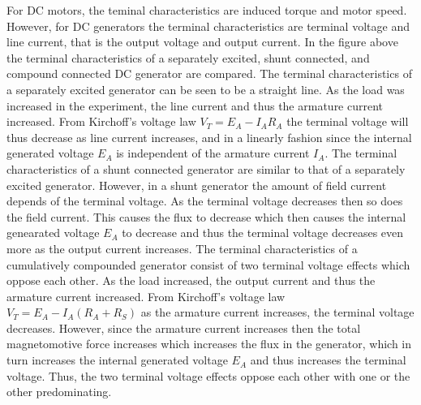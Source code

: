 \documentclass{article}
\begin{document}
For DC motors, the teminal characteristics are induced torque and motor speed. However, for DC generators the 
terminal characteristics are terminal voltage and line current, that is the output voltage and output current. 
In the figure above the terminal characteristics of a separately excited, shunt connected, and compound connected
DC generator are compared. The terminal characteristics of a separately excited generator can be seen to be a straight 
line. As the load was increased in the experiment, the line current and thus the armature current increased. From 
Kirchoff's voltage law $V_T = E_A - I_AR_A$ the terminal voltage will thus decrease as line current increases, and 
in a linearly fashion since the internal generated voltage $E_A$ is independent of the armature current $I_A$. The 
terminal characteristics of a shunt connected generator are similar to that of a separately excited generator. However,
in a shunt generator the amount of field current depends of the terminal voltage. As the terminal voltage decreases then 
so does the field current. This causes the flux to decrease which then causes the internal genearated voltage $E_A$ to 
decrease and thus the terminal voltage decreases even more as the output current increases. The terminal characteristics 
of a cumulatively compounded generator consist of two terminal voltage effects which oppose each other. As the load 
increased, the output current and thus the armature current increased. From Kirchoff's voltage law 
$V_T = E_A - I_A(R_A + R_S)$ as the armature current increases, the terminal voltage decreases. However, since the 
armature current increases then the total magnetomotive force increases which increases the flux in the 
generator, which in turn increases the internal generated voltage $E_A$ and thus increases the terminal voltage. Thus,
the two terminal voltage effects oppose each other with one or the other predominating.
\end{document}
